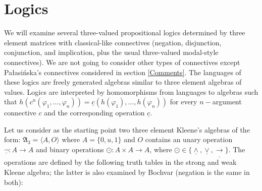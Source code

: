 \documentclass[11pt,a4paper,titlepage]{article}
\theoremstyle{definition}
\newcommand{\3}{\vspace{.3in}}
\newcommand{\2}{\vspace{.2in}}
\newcommand{\1}{\vspace{.1in}}
\newcommand{\5}{\vspace{.05in}}
\begin{document}
\section{Logics}\label{Logics}
We will examine several three-valued propositional logics determined by three element matrices with classical-like connectives (negation, disjunction, conjunction, and implication, plus the usual three-valued modal-style connectives). We are not going to consider other types of connectives except Pa\l{}asi\'{n}ska's connectives considered in section \ref{Comments}. 
The languages of these logics are freely generated algebras similar to three element algebras of values. Logics are interpreted by homomorphisms from languages to algebras such that $h(c^n(\varphi_1, \ldots, \varphi_n))= \underline{c}(h(\varphi_1), \ldots, h(\varphi_n))$ for every $n-$argument connective $c$ and the corresponding operation $\underline{c}$.  

Let us consider as the starting point two three element Kleene's algebras of the form: $\mathfrak{A}_3 = \langle A, O\rangle$ where $A=\{0, u, 1\}$ and $O$ contains an unary
operation $\underline{\neg}:A\longrightarrow A$ and binary operations $\odot: A\times A\longrightarrow A $,
where $\odot \in \{\underline{\wedge} , \underline{\vee} , \underline{\rightarrow} \}$. 
The operations are defined by
the following truth tables in the strong and weak Kleene algebra; the latter is also examined by Bochvar \cite{Bochvar} (negation is the same in both):
\end{document}
